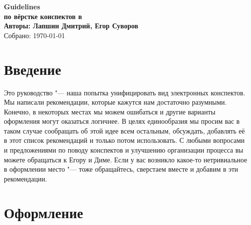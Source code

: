 
\usepackage{metalogo}
\usepackage{verbatim}

\renewcommand{\thesection}{\arabic{section}}
\newcommand{\ok}{& \textcolor{green!60!black}{Правильно}}
\newcommand{\bad}{& \textcolor{red}{Неправильно}}



\begin{center}
{\huge \bf Guidelines} \\
{\Large \bf по вёрстке конспектов в \XeLaTeX} \\
\vspace{0.5em}
{\large \bf Авторы: Лапшин Дмитрий, Егор Суворов} \\
\vspace{0.5em}
{Собрано: \today~\currenttime} \\
\end{center}

\section{Введение}
Это руководство "--- наша попытка унифицировать вид электронных конспектов.
Мы написали рекомендации, которые кажутся нам достаточно разумными.
Конечно, в некоторых местах мы можем ошибаться и другие варианты оформления могут оказаться логичнее.
В целях единообразия мы просим вас в таком случае сообращать об этой идее всем остальным,
обсуждать, добавлять её в этот список рекомендаций и только потом использовать.
С любыми вопросами и предложениями по поводу конспектов и улучшению организации
процесса вы можете обращаться к Егору и Диме.
Если у вас возникло какое-то нетривиальное в оформлении место "--- тоже обращайтесь,
сверстаем вместе и добавим в эти рекомендации.

\section{Оформление}

